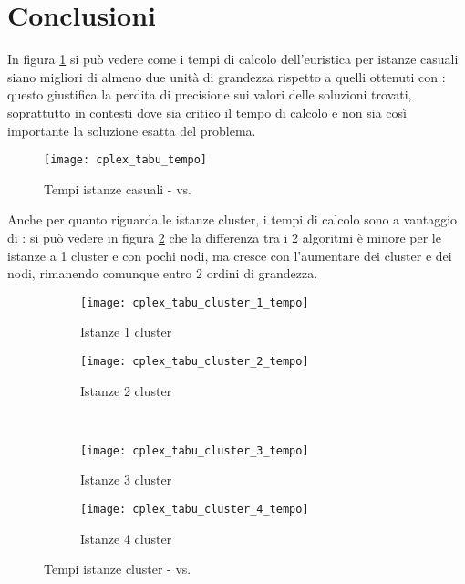\section{Conclusioni}

In figura \ref{fig:tempi cplex tabu} si può vedere come i tempi di calcolo dell'euristica \tabu per istanze casuali siano migliori di almeno due unità di grandezza rispetto a quelli ottenuti con : questo giustifica la perdita di precisione sui valori delle soluzioni trovati, soprattutto in contesti dove sia critico il tempo di calcolo e non sia così importante la soluzione esatta del problema.

\begin{figure}[H]
	\centering
	\texttt{[image: cplex\_tabu\_tempo]}
	\caption{Tempi istanze casuali -  vs. \tabu}
	\label{fig:tempi cplex tabu}
\end{figure}

Anche per quanto riguarda le istanze cluster, i tempi di calcolo sono a vantaggio di \tabu: si può vedere in figura \ref{fig:tempi cplex tabu cluster} che la differenza tra i 2 algoritmi è minore per le istanze a 1 cluster e con pochi nodi, ma cresce con l'aumentare dei cluster e dei nodi,  rimanendo comunque entro 2 ordini di grandezza.

\begin{figure}[H]
	\centering
	\begin{subfigure}[b]{.45\textwidth}
		\texttt{[image: cplex\_tabu\_cluster\_1\_tempo]}
		\caption{Istanze 1 cluster}
	\end{subfigure}
	\quad
	\begin{subfigure}[b]{.45\textwidth}
		\texttt{[image: cplex\_tabu\_cluster\_2\_tempo]}
		\caption{Istanze 2 cluster}
	\end{subfigure}
	\\
	\begin{subfigure}[b]{.45\textwidth}
		\texttt{[image: cplex\_tabu\_cluster\_3\_tempo]}
		\caption{Istanze 3 cluster}
	\end{subfigure}
	\quad
	\begin{subfigure}[b]{.45\textwidth}
		\texttt{[image: cplex\_tabu\_cluster\_4\_tempo]}
		\caption{Istanze 4 cluster}
	\end{subfigure}
	\caption{Tempi istanze cluster -  vs. \tabu}
	\label{fig:tempi cplex tabu cluster}
\end{figure}

